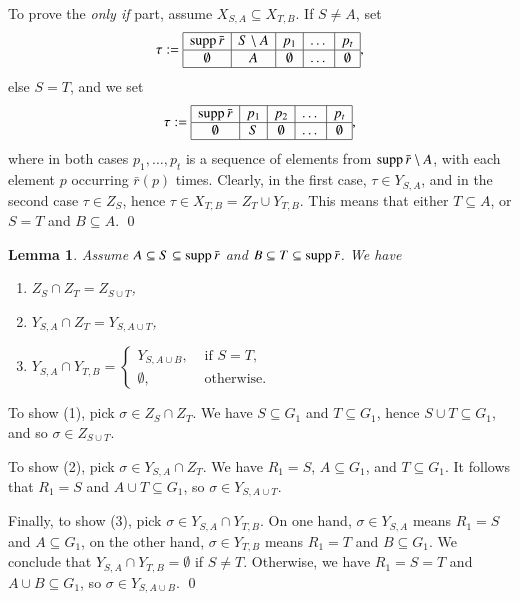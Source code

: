 \documentclass{amsart}[10pt]
\newtheorem{lm}[theorem]{Lemma}
\newcommand{\pr}{\nin{\bf Proof.} }
\newcommand{\es}{\emptyset}
\newcommand{\sm}{\setminus}
\newcommand{\supp}{\text{\rm supp}\,}
\newcommand{\tr}{{\bar r}}
\numberwithin{equation}{section}
\numberwithin{figure}{section}
\numberwithin{table}{section}
\begin{document}
To prove the {\it only if} part, assume $X_{S,A}\subseteq X_{T,B}$. If
$S\neq A$, set
\[\tau:=\begin{array}{|c|c|c|c|c|}
\hline
\supp\tr & S\sm A & p_1 & \dots & p_t \\ \hline
\es      & A      & \es & \dots & \es \\ 
\hline
\end{array},\]
else $S=T$, and we set
\[\tau:=\begin{array}{|c|c|c|c|c|}
\hline
\supp\tr & p_1 & p_2 & \dots & p_t \\ \hline
\es      & S   & \es & \dots & \es \\ 
\hline
\end{array},\]
where in both cases $p_1,\dots,p_t$ is a sequence of elements from
$\supp\tr\sm A$, with each element $p$ occurring $\tr(p)$
times. Clearly, in the first case, $\tau\in Y_{S,A}$, and in the
second case $\tau\in Z_S$, hence $\tau\in X_{T,B}=Z_T\cup Y_{T,B}$.
This means that either $T\subseteq A$, or $S=T$ and $B\subseteq A$.
\qed

\begin{lm}\label{lm:yzint}
Assume $A\subseteq S\subseteq\supp\tr$ and
$B\subseteq T\subseteq\supp\tr$. We have
\begin{enumerate}
	\item [(1)] $Z_S\cap Z_T=Z_{S\cup T}$,
	\item [(2)] $Y_{S,A}\cap Z_T=Y_{S,A\cup T}$,
	\item [(3)] $Y_{S,A}\cap Y_{T,B}=\begin{cases}
	Y_{S,A\cup B}, & \textrm{ if } S=T,\\ 
	\es, & \textrm{ otherwise}.\end{cases}$
\end{enumerate}
\end{lm}
\pr To show (1), pick $\sigma\in Z_S\cap Z_T$. We have $S\subseteq
G_1$ and $T\subseteq G_1$, hence $S\cup T\subseteq G_1$, and so
$\sigma\in Z_{S\cup T}$.

To show (2), pick $\sigma\in Y_{S,A}\cap Z_T$. We have $R_1=S$,
$A\subseteq G_1$, and $T\subseteq G_1$. It follows that $R_1=S$ and
$A\cup T\subseteq G_1$, so $\sigma\in Y_{S,A\cup T}$.

Finally, to show (3), pick $\sigma\in Y_{S,A}\cap Y_{T,B}$. On one
hand, $\sigma\in Y_{S,A}$ means $R_1=S$ and $A\subseteq G_1$, on the
other hand, $\sigma\in Y_{T,B}$ means $R_1=T$ and $B\subseteq G_1$. We
conclude that $Y_{S,A}\cap Y_{T,B}=\es$ if $S\neq T$. Otherwise, we
have $R_1=S=T$ and $A\cup B\subseteq G_1$, so $\sigma\in Y_{S,A\cup
  B}$.  \qed
\end{document}
